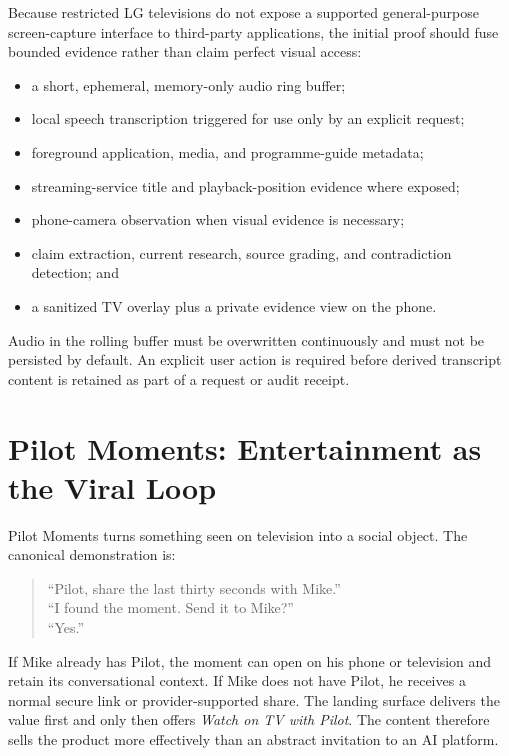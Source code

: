 \documentclass[11pt,a4paper]{article}
\begin{document}
Because restricted LG televisions do not expose a supported general-purpose
screen-capture interface to third-party applications, the initial proof should
fuse bounded evidence rather than claim perfect visual access:

\begin{itemize}[leftmargin=*]
  \item a short, ephemeral, memory-only audio ring buffer;
  \item local speech transcription triggered for use only by an explicit
        request;
  \item foreground application, media, and programme-guide metadata;
  \item streaming-service title and playback-position evidence where exposed;
  \item phone-camera observation when visual evidence is necessary;
  \item claim extraction, current research, source grading, and contradiction
        detection; and
  \item a sanitized TV overlay plus a private evidence view on the phone.
\end{itemize}

Audio in the rolling buffer must be overwritten continuously and must not be
persisted by default.  An explicit user action is required before derived
transcript content is retained as part of a request or audit receipt.

\section{Pilot Moments: Entertainment as the Viral Loop}

Pilot Moments turns something seen on television into a social object.  The
canonical demonstration is:

\begin{quote}
``Pilot, share the last thirty seconds with Mike.''\\
``I found the moment.  Send it to Mike?''\\
``Yes.''
\end{quote}

If Mike already has Pilot, the moment can open on his phone or television and
retain its conversational context.  If Mike does not have Pilot, he receives a
normal secure link or provider-supported share.  The landing surface delivers
the value first and only then offers \emph{Watch on TV with Pilot}.  The content
therefore sells the product more effectively than an abstract invitation to an
AI platform.
\end{document}
